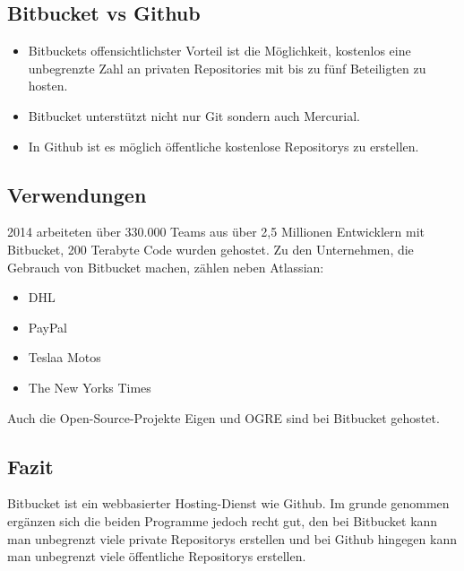 	\subsection{Bitbucket vs Github}

		\begin{itemize}

			\item Bitbuckets offensichtlichster Vorteil ist die Möglichkeit, kostenlos eine unbegrenzte Zahl an privaten Repositories mit bis zu fünf Beteiligten zu hosten.

			\item Bitbucket unterstützt nicht nur Git sondern auch Mercurial.
			\item In Github ist es möglich öffentliche kostenlose Repositorys zu erstellen.

		\end{itemize}
	\subsection{Verwendungen}
		2014 arbeiteten über 330.000 Teams aus über 2,5 Millionen Entwicklern mit Bitbucket, 200 Terabyte Code wurden gehostet. Zu den Unternehmen, die Gebrauch von Bitbucket machen, zählen neben Atlassian:
		\begin{itemize}
			\item DHL
			\item PayPal
 
			\item Teslaa Motos
			\item The New Yorks Times
		\end{itemize}
Auch die Open-Source-Projekte Eigen und OGRE sind bei Bitbucket gehostet.
	\subsection{Fazit}
    
		Bitbucket ist ein webbasierter Hosting-Dienst wie Github. Im grunde genommen ergänzen sich die beiden Programme jedoch recht gut, den bei Bitbucket kann man unbegrenzt viele private Repositorys erstellen und bei Github hingegen kann man unbegrenzt viele öffentliche Repositorys erstellen.
